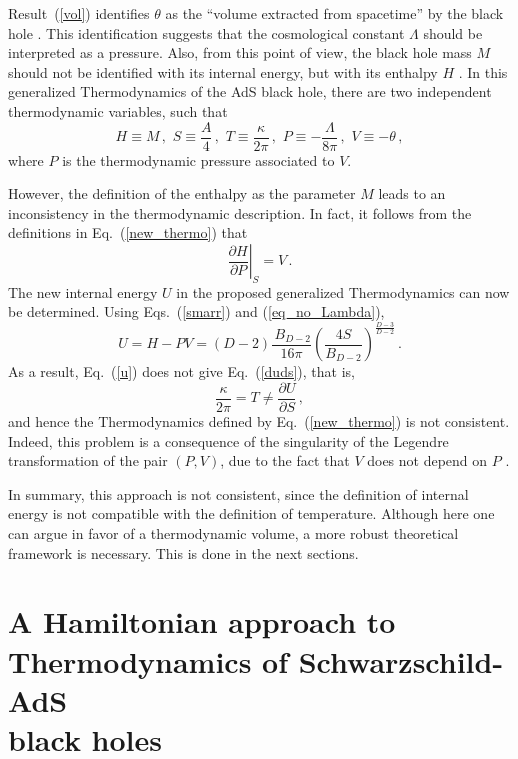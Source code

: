 \documentclass[prd,onecolumn,notitlepage,amsmath,nofootinbib,superscriptaddress,showpacs,showkeys]{revtex4-1}
\begin{document}
Result~(\ref{vol}) identifies $\theta$ as the ``volume extracted
from spacetime'' by the black hole \cite{kastor2009}. This identification
suggests that the cosmological constant $\Lambda$ should be interpreted
as a pressure. Also, from this point of view, the black hole mass
$M$ should not be identified with its internal energy, but with its
enthalpy $H$ \cite{kastor2009}. 
%
In this generalized Thermodynamics of the AdS black hole, there are two independent thermodynamic variables, such that 
\begin{equation}
H\equiv M\,,\,\, S\equiv\frac{A}{4}\,,\,\, T\equiv\frac{\kappa}{2\pi}\,,\,\, P\equiv-\frac{\Lambda}{8\pi}\,,\,\, V\equiv-\theta\,,\label{new_thermo}
\end{equation}
where $P$ is the thermodynamic pressure associated to $V$.

However, the definition of the enthalpy as the parameter $M$ leads
to an inconsistency in the thermodynamic description. In fact, it
follows from the definitions in Eq.~(\ref{new_thermo}) that 
\begin{equation}
\left.\frac{\partial H}{\partial P}\right|_{S}=V\,.
\end{equation}
The new internal energy $U$ in the proposed generalized Thermodynamics
can now be determined. Using Eqs.~(\ref{smarr}) and (\ref{eq_no_Lambda}),
\begin{equation}
U=H-PV=\left(D-2\right)\frac{\, B_{D-2}}{16\pi}\left(\frac{4S}{B_{D-2}}\right)^{\frac{D-3}{D-2}}\,.\label{u}
\end{equation}
As a result, Eq.~(\ref{u}) does not give Eq.~(\ref{duds}), that
is, 
\begin{equation}
\frac{\kappa}{2\pi}=T\ne\frac{\partial U}{\partial S}\,,
\end{equation}
and hence the Thermodynamics defined by Eq.~(\ref{new_thermo}) is
not consistent. Indeed, this problem is a consequence of the singularity
of the Legendre transformation of the pair $\left(P,V\right)$, due
to the fact that $V$ does not depend on $P$ \cite{2011}.

In summary, this approach is not consistent, since the definition of internal energy is not compatible with the definition of temperature. Although here one can argue in favor of a thermodynamic volume, a more robust theoretical framework is necessary. This is done in the next sections.


\section{\label{sec:A-Symplectic-approach}A Hamiltonian approach to Thermodynamics
of Schwarzschild-A\MakeLowercase{d}S \\ black holes}
\end{document}
